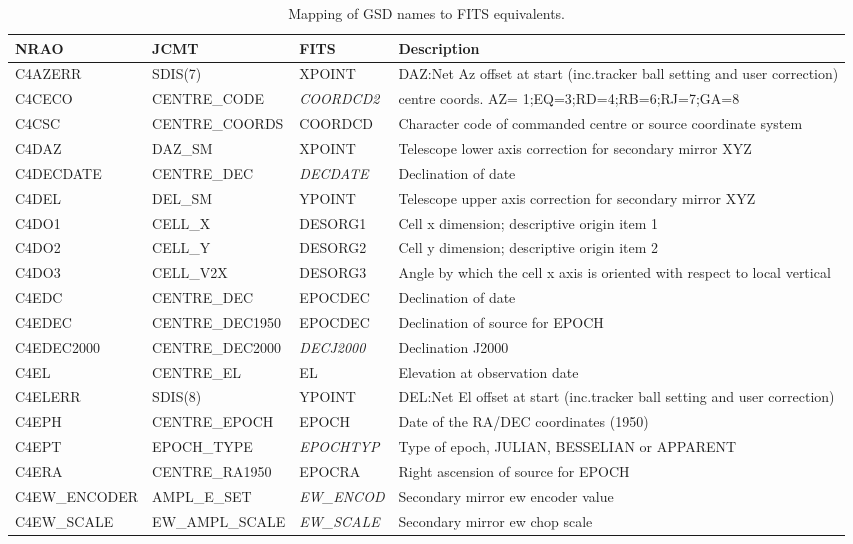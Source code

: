 \begin{sidewaystable*}
\caption{Mapping of GSD names to FITS equivalents.}
\begin{center}
\small
\begin{tabular}{llll}
\hline
NRAO & JCMT & FITS & Description\\ \hline

C4AZERR & SDIS(7) & XPOINT & DAZ:Net Az offset at start (inc.tracker ball setting and user correction)\\
C4CECO & CENTRE\_CODE & \emph{COORDCD2} & centre coords. AZ= 1;EQ=3;RD=4;RB=6;RJ=7;GA=8\\
C4CSC & CENTRE\_COORDS & COORDCD & Character code of commanded centre or source coordinate system\\
C4DAZ & DAZ\_SM & XPOINT & Telescope lower axis correction for secondary mirror XYZ\\
C4DECDATE & CENTRE\_DEC & \emph{DECDATE} & Declination of date\\
C4DEL & DEL\_SM & YPOINT & Telescope upper axis correction for secondary mirror XYZ\\
C4DO1 & CELL\_X & DESORG1 & Cell x dimension; descriptive origin item 1\\
C4DO2 & CELL\_Y & DESORG2 & Cell y dimension; descriptive origin item 2\\
C4DO3 & CELL\_V2X & DESORG3 & Angle by which the cell x axis is oriented with respect to local vertical\\
C4EDC & CENTRE\_DEC & EPOCDEC & Declination of date\\
C4EDEC & CENTRE\_DEC1950 & EPOCDEC & Declination of source for EPOCH\\
C4EDEC2000 & CENTRE\_DEC2000 & \emph{DECJ2000} & Declination J2000\\
C4EL & CENTRE\_EL & EL & Elevation at observation date\\
C4ELERR & SDIS(8) & YPOINT & DEL:Net El offset at start (inc.tracker ball setting and user correction)\\
C4EPH & CENTRE\_EPOCH & EPOCH & Date of the RA/DEC coordinates (1950)\\
C4EPT & EPOCH\_TYPE & \emph{EPOCHTYP} & Type of epoch, JULIAN, BESSELIAN or APPARENT\\
C4ERA & CENTRE\_RA1950 & EPOCRA & Right ascension of source for EPOCH\\
C4EW\_ENCODER & AMPL\_E\_SET & \emph{EW\_ENCOD} & Secondary mirror ew encoder value\\
C4EW\_SCALE & EW\_AMPL\_SCALE & \emph{EW\_SCALE} & Secondary mirror ew chop scale\\

\end{tabular}
\end{center}
\end{sidewaystable*}
